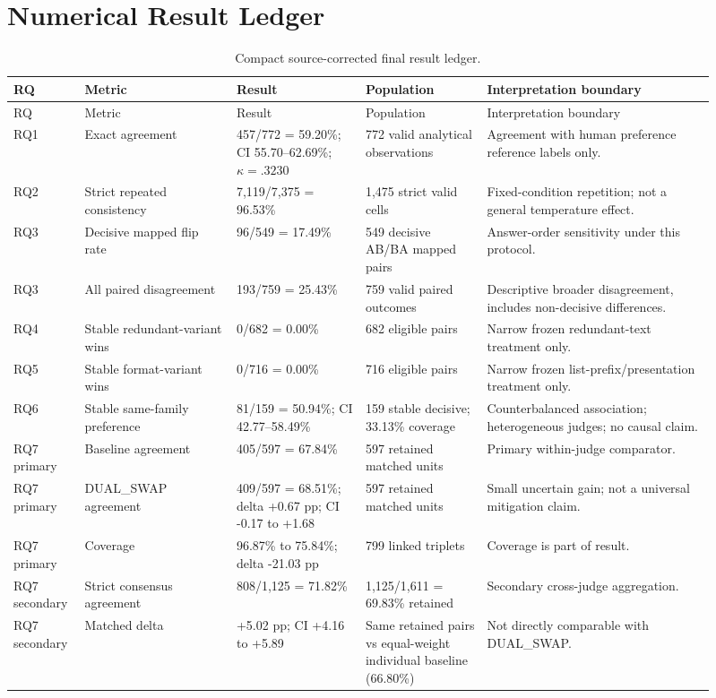\chapter{Numerical Result Ledger}

\begin{landscape}
\small
\begin{longtable}{@{}p{0.08\linewidth}p{0.20\linewidth}p{0.17\linewidth}p{0.16\linewidth}p{0.30\linewidth}@{}}
\caption{Compact source-corrected final result ledger.}\label{tab:ledger}\\
\toprule
RQ & Metric & Result & Population & Interpretation boundary\\
\midrule
\endfirsthead
\toprule RQ & Metric & Result & Population & Interpretation boundary\\\midrule
\endhead
RQ1 & Exact agreement & 457/772 = 59.20\%; CI 55.70--62.69\%; $\kappa=.3230$ & 772 valid analytical observations & Agreement with human preference reference labels only.\\
RQ2 & Strict repeated consistency & 7,119/7,375 = 96.53\% & 1,475 strict valid cells & Fixed-condition repetition; not a general temperature effect.\\
RQ3 & Decisive mapped flip rate & 96/549 = 17.49\% & 549 decisive AB/BA mapped pairs & Answer-order sensitivity under this protocol.\\
RQ3 & All paired disagreement & 193/759 = 25.43\% & 759 valid paired outcomes & Descriptive broader disagreement, includes non-decisive differences.\\
RQ4 & Stable redundant-variant wins & 0/682 = 0.00\% & 682 eligible pairs & Narrow frozen redundant-text treatment only.\\
RQ5 & Stable format-variant wins & 0/716 = 0.00\% & 716 eligible pairs & Narrow frozen list-prefix/presentation treatment only.\\
RQ6 & Stable same-family preference & 81/159 = 50.94\%; CI 42.77--58.49\% & 159 stable decisive; 33.13\% coverage & Counterbalanced association; heterogeneous judges; no causal claim.\\
RQ7 primary & Baseline agreement & 405/597 = 67.84\% & 597 retained matched units & Primary within-judge comparator.\\
RQ7 primary & DUAL\_SWAP agreement & 409/597 = 68.51\%; delta +0.67 pp; CI -0.17 to +1.68 & 597 retained matched units & Small uncertain gain; not a universal mitigation claim.\\
RQ7 primary & Coverage & 96.87\% to 75.84\%; delta -21.03 pp & 799 linked triplets & Coverage is part of result.\\
RQ7 secondary & Strict consensus agreement & 808/1,125 = 71.82\% & 1,125/1,611 = 69.83\% retained & Secondary cross-judge aggregation.\\
RQ7 secondary & Matched delta & +5.02 pp; CI +4.16 to +5.89 & Same retained pairs vs equal-weight individual baseline (66.80\%) & Not directly comparable with DUAL\_SWAP.\\
\bottomrule
\end{longtable}
\end{landscape}


